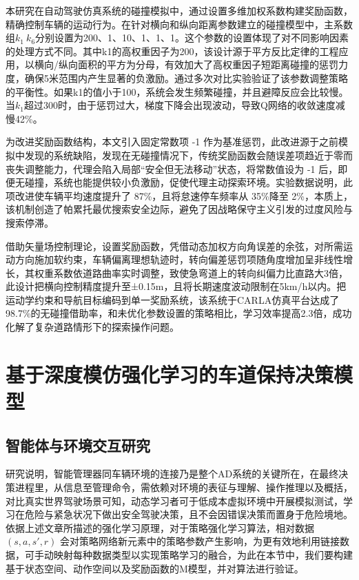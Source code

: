 本研究在自动驾驶仿真系统的碰撞模拟中，通过设置多维加权系数构建奖励函数，精确控制车辆的运动行为。在针对横向和纵向距离参数建立的碰撞模型中，主系数组\(k_1~k_6\)分别设置为200、1、10、1、1、1。这个参数的设置体现了对不同影响因素的处理方式不同。其中k1的高权重因子为200，该设计源于平方反比定律的工程应用，以横向/纵向面积的平方为分母，有效加大了高权重因子短距离碰撞的惩罚力度，确保5米范围内产生显著的负激励。通过多次对比实验验证了该参数调整策略的平衡性。如果k1的值小于100，系统会发生频繁碰撞，并且避障反应会比较慢。当\(k_1\)超过300时，由于惩罚过大，梯度下降会出现波动，导致Q网络的收敛速度减慢42\%。

为改进奖励函数结构，本文引入固定常数项 -1 作为基准惩罚，此改进源于之前模拟中发现的系统缺陷，发现在无碰撞情况下，传统奖励函数会随误差项趋近于零而丧失调整能力，代理会陷入局部“安全但无法移动”状态，将常数值设为 -1 后，即便无碰撞，系统也能提供较小负激励，促使代理主动探索环境。实验数据说明，此项改进使车辆平均速度提升了 87\%，且将怠速停车频率从 35\%降至 2\%，本质上，该机制创造了帕累托最优搜索安全边际，避免了因战略保守主义引发的过度风险与搜索停滞。

借助矢量场控制理论，设置奖励函数，凭借动态加权方向角误差的余弦，对所需运动方向施加软约束，车辆偏离理想轨迹时，转向偏差惩罚项随角度增加呈非线性增长，其权重系数依道路曲率实时调整，致使急弯道上的转向纠偏力比直路大3倍，此设计把横向控制精度提升至±0.15m，且将长期速度波动限制在5km/h以内。把运动学约束和导航目标编码到单一奖励系统，该系统于CARLA仿真平台达成了98.7\%的无碰撞借助率，和未优化参数设置的策略相比，学习效率提高2.3倍，成功化解了复杂道路情形下的探索操作问题。
\section{基于深度模仿强化学习的车道保持决策模型}

\subsection{智能体与环境交互研究}

研究说明，智能管理器同车辆环境的连接乃是整个AD系统的关键所在，在最终决策进程里，从信息至管理命令，需依赖对环境的表征与理解、操作推理以及概括，对比真实世界驾驶场景可知，动态学习者可于低成本虚拟环境中开展模拟测试，学习在危险与紧急状况下做出安全驾驶决策，且不会因错误决策而置身于危险境地。依据上述文章所描述的强化学习原理，对于策略强化学习算法，相对数据\((𝑠, 𝑎, 𝑠′, 𝑟)\) 会对策略网络新元素中的策略参数产生影响，为更有效地利用链接数据，可手动映射每种数据类型以实现策略学习的融合，为此在本节中，我们要构建基于状态空间、动作空间以及奖励函数的M模型，并对算法进行验证。

